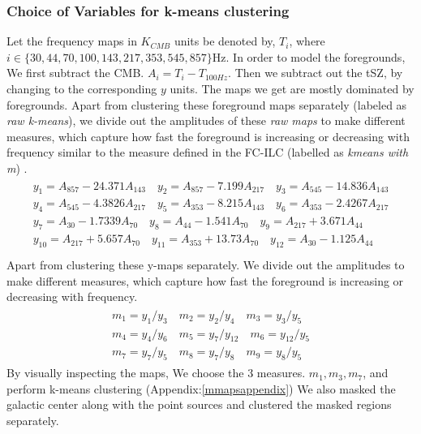 \subsubsection{Choice of Variables for k-means clustering}
Let the frequency maps in $K_{CMB}$ units be denoted by, $T_i$,
where \\$i \in \{30, 44, 70, 100,143, 217, 353, 545, 857\}$Hz.
In order to model the foregrounds, We first subtract the CMB.
$A_i = T_i - T_{100Hz}$. Then we subtract out the tSZ, by changing to the
corresponding $y$ units. The maps we get are mostly dominated by foregrounds.
Apart from clustering these foreground maps separately
(labeled as \emph{raw k-means}),
we divide out the amplitudes of these \emph{raw maps} to make different measures,
which capture how fast the foreground is increasing or decreasing
with frequency similar to the measure defined in the FC-ILC (labelled as \emph{kmeans with m})
\cite{datarishi}.
\\
  \begin{align}
    \begin{split}
        y_1 = A_{857} - 24.371 A_{143}\quad y_2 = A_{857} - 7.199 A_{217}\quad y_3 = A_{545} - 14.836 A_{143}\\
        y_4 = A_{545} - 4.3826 A_{217}\quad y_5 = A_{353} - 8.215 A_{143}\quad y_6 = A_{353} - 2.4267 A_{217}\\
        y_7 = A_{30} - 1.7339 A_{70}\quad y_8 = A_{44} - 1.541 A_{70}\quad y_9 = A_{217} + 3.671 A_{44}\\
        y_{10} = A_{217} + 5.657 A_{70}\quad y_{11} = A_{353} + 13.73 A_{70}\quad y_{12} = A_{30} - 1.125 A_{44}\\
    \end{split}
  \end{align}
  Apart from clustering these y-maps separately. We divide out the amplitudes to make different
  measures, which capture how fast the foreground is increasing or decreasing with frequency.
  \begin{align}
    \begin{split}
        m_1 = y_1/y_3 \quad m_2 = y_2/y_4 \quad m_3 = y_3/y_5\\
        m_4 = y_4/y_6 \quad m_5 = y_7/y_{12} \quad m_6 = y_{12}/y_5\\
        m_7 = y_7/y_5 \quad m_8 = y_7/y_8 \quad m_9 = y_8/y_5
    \end{split}
  \end{align}
By visually inspecting the maps, We choose the 3 measures. $m_1, m_3, m_7$,
and perform k-means clustering (Appendix:\ref{mmapsappendix})
We also masked the galactic center along with the point sources and clustered
the masked regions separately.
